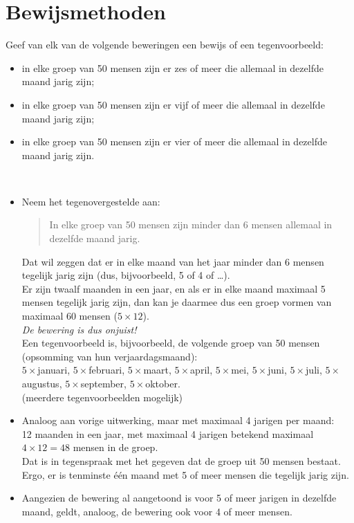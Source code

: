 \section{Bewijsmethoden}
\begin{answer}[Optioneel]
Geef van elk van de volgende beweringen een bewijs of een tegenvoorbeeld:
\begin{itemize}
\item in elke groep van 50 mensen zijn er zes of meer die allemaal in dezelfde maand jarig zijn;
\item in elke groep van 50 mensen zijn er vijf of meer die allemaal in dezelfde maand jarig zijn;
\item in elke groep van 50 mensen zijn er vier of meer die allemaal in dezelfde maand jarig zijn.
\end{itemize}\mbox{}\\[2.5pt]
\begin{itemize}
    \item Neem het tegenovergestelde aan:
\begin{quote}
    In elke groep van 50 mensen zijn minder dan 6 mensen allemaal in dezelfde maand jarig.
\end{quote}
Dat wil zeggen dat er in elke maand van het jaar minder dan 6 mensen tegelijk jarig zijn (dus, bijvoorbeeld, 5 of 4 of \ldots).\\[2.5pt]
Er zijn twaalf maanden in een jaar, en als er in elke maand maximaal 5 mensen tegelijk jarig zijn, dan kan je daarmee dus een groep vormen van maximaal 60 mensen ($5\times 12$).\\[2.5pt]
\textit{De bewering is dus onjuist!}\\[2.5pt]
Een tegenvoorbeeld is, bijvoorbeeld, de volgende groep van 50 mensen (opsomming van hun verjaardagsmaand):\\
$5\times$januari, $5\times$februari, $5\times$maart, $5\times$april, $5\times$mei, $5\times$juni, $5\times$juli, $5\times$augustus, $5\times$september, $5\times$oktober.\\(meerdere tegenvoorbeelden mogelijk)
\item Analoog aan vorige uitwerking, maar met maximaal 4 jarigen per maand:\\[2.5pt]
12 maanden in een jaar, met maximaal 4 jarigen betekend maximaal $4\times 12=48$ mensen in de groep.\\[2.5pt]
Dat is in tegenspraak met het gegeven dat de groep uit 50 mensen bestaat.\\[2.5pt]
Ergo, er is tenminste \'e\'en maand met 5 of meer mensen die tegelijk jarig zijn.
\item Aangezien de bewering al aangetoond is voor 5 of meer jarigen in dezelfde maand, geldt, analoog, de bewering ook voor 4 of meer mensen.
\end{itemize}
\end{answer}

